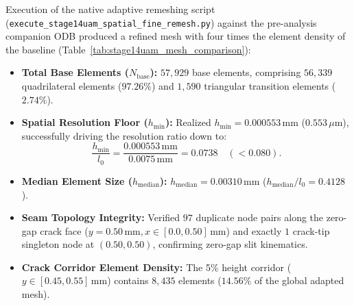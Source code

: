 Execution of the native adaptive remeshing script (\texttt{execute\_stage14uam\_spatial\_fine\_remesh.py}) against the pre-analysis companion ODB produced a refined mesh with four times the element density of the baseline (Table~\ref{tab:stage14uam_mesh_comparison}):
\begin{itemize}
  \item \textbf{Total Base Elements ($N_{\mathrm{base}}$):} $57,929$ base elements, comprising $56,339$ quadrilateral elements ($97.26\%$) and $1,590$ triangular transition elements ($2.74\%$).
  \item \textbf{Spatial Resolution Floor ($h_{\min}$):} Realized $h_{\min} = 0.000553\,\mathrm{mm}$ ($0.553\,\mu\mathrm{m}$), successfully driving the resolution ratio down to:
  \begin{equation}
    \frac{h_{\min}}{l_0} = \frac{0.000553\,\mathrm{mm}}{0.0075\,\mathrm{mm}} = 0.0738 \quad (< 0.080).
  \end{equation}
  \item \textbf{Median Element Size ($h_{\mathrm{median}}$):} $h_{\mathrm{median}} = 0.00310\,\mathrm{mm}$ ($h_{\mathrm{median}}/l_0 = 0.4128$).
  \item \textbf{Seam Topology Integrity:} Verified $97$ duplicate node pairs along the zero-gap crack face ($y = 0.50\,\mathrm{mm}, x \in [0.0, 0.50]\,\mathrm{mm}$) and exactly $1$ crack-tip singleton node at $(0.50, 0.50)$, confirming zero-gap slit kinematics.
  \item \textbf{Crack Corridor Element Density:} The 5\% height corridor ($y \in [0.45, 0.55]\,\mathrm{mm}$) contains $8,435$ elements ($14.56\%$ of the global adapted mesh).
\end{itemize}


